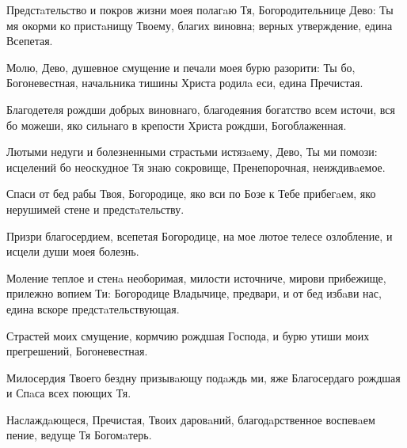 \begin{mymulticols}


Предстaтельство и покров жизни моея полагaю Тя, Богородительнице Дево: Ты мя окорми ко пристaнищу Твоему, благих виновна; верных утверждение, едина Всепетая.


Молю, Дево, душевное смущение и печали моея бурю разорити: Ты бо, Богоневестная, начальника тишины Христа родилa еси, едина Пречистая.

\slava

Благодетеля рождши добрых виновнаго, благодеяния богатство всем источи, вся бо можеши, яко сильнаго в крепости Христа рождши, Богоблаженная.

\inyne

Лютыми недуги и болезненными страстьми истязaему, Дево, Ты ми помози: исцелений бо неоскудное Тя знаю сокровище, Пренепорочная, неиждивaемое.

Спаси от бед рабы Твоя, Богородице, яко вси по Бозе к Тебе прибегaем, яко нерушимей стене и предстaтельству.

Призри благосердием, всепетая Богородице, на мое лютое телесе озлобление, и исцели души моея болезнь.


Моление теплое и стенa необоримая, милости источниче, мирови прибежище, прилежно вопием Ти: Богородице Владычице, предвари, и от бед избaви нас, едина вскоре предстaтельствующая.




Страстей моих смущение, кормчию рождшая Господа, и бурю утиши моих прегрешений, Богоневестная.


Милосердия Твоего бездну призывaющу подaждь ми, яже Благосердаго рождшая и Спaса всех поющих Тя.


Наслаждaющеся, Пречистая, Твоих даровaний, благодaрственное воспевaем пение, ведуще Тя Богомaтерь.


\end{mymulticols}
